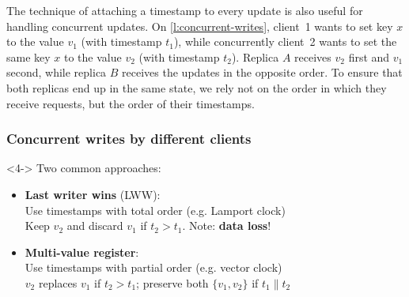 The technique of attaching a timestamp to every update is also useful for handling concurrent updates.
On \autoref{l:concurrent-writes}, client~1 wants to set key $x$ to the value $v_1$ (with timestamp $t_1$), while concurrently client~2 wants to set the same key $x$ to the value $v_2$ (with timestamp $t_2$).
Replica $A$ receives $v_2$ first and $v_1$ second, while replica $B$ receives the updates in the opposite order.
To ensure that both replicas end up in the same state, we rely not on the order in which they receive requests, but the order of their timestamps.

\begin{frame}
    \label{s:concurrent-writes}
    \frametitle{Concurrent writes by different clients}
    \begin{center}
    \end{center}%
    \begin{uncoverenv}<4->
        Two common approaches:
        \begin{itemize}
            \item \textbf{Last writer wins} (LWW):\\
                Use timestamps with total order (e.g. Lamport clock)\\
                Keep $v_2$ and discard $v_1$ if $t_2 > t_1$. Note: \textbf{data loss}!
            \item<5-> \textbf{Multi-value register}:\\
                Use timestamps with partial order (e.g. vector clock)\\
                $v_2$ replaces $v_1$ if $t_2 > t_1$; preserve both $\{v_1,v_2\}$ if $t_1 \parallel t_2$\\[1em]
        \end{itemize}
    \end{uncoverenv}
\end{frame}
\label{l:concurrent-writes}


